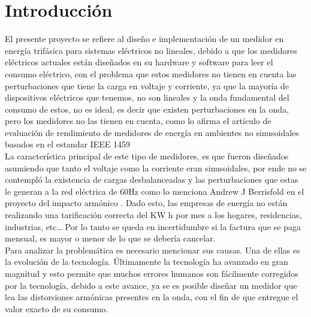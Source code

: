 

\newpage{\clearpage}
\chapter{ Introducción}

El presente proyecto se refiere al diseño e implementación de un medidor en energía trifásica para sistemas eléctricos no lineales, debido a que los medidores eléctricos actuales están diseñados en su hardware y software para leer el consumo eléctrico, con el problema que estos medidores no tienen en cuenta las perturbaciones que tiene la carga en voltaje y corriente, ya que la mayoría de dispositivos eléctricos que tenemos, no son lineales y la onda fundamental del consumo de estos, no es ideal, es decir que existen perturbaciones en la onda, pero los medidores no las tienen en cuenta, como lo afirma el artículo de evaluación de rendimiento de medidores de energía en ambientes no sinusoidales basados en el estandar IEEE 1459 \cite{A42} \\

La característica principal de este tipo de medidores, es que fueron diseñados asumiendo que tanto el voltaje como la corriente eran sinusoidales, por ende no se contempló la existencia de cargas desbalanceadas y las perturbaciones que estas le generan a la red eléctrica de 60Hz como lo menciona Andrew J Berrisfold en el proyecto del impacto armónico \cite{A43}. Dado esto, las empresas de energía no están realizando una tarificación correcta del KW h por mes a los hogares, residencias, industrias, etc… Por lo tanto se queda en incertidumbre si la factura que se paga mensual, es mayor o menor de lo que se debería cancelar.\\

Para analizar la problemática es necesario mencionar sus causas. Una de ellas es la evolución de la tecnología. Últimamente la tecnología ha avanzado en gran magnitud y esto permite que muchos errores humanos son fácilmente corregidos por la tecnología, debido a este avance, ya se es posible diseñar un medidor que lea las distorsiones armónicas presentes en la onda, con el fin de que entregue el valor exacto de su consumo.\\

